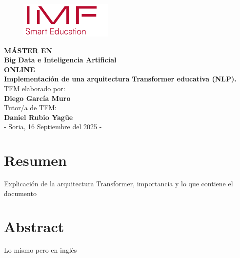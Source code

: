 \documentclass[11pt]{book}
\newcommand{\clearemptydoublepage}{\newpage{\pagestyle{empty}\cleardoublepage}}
\theoremstyle{plain}
\theoremstyle{definition}
\begin{document}
\frontmatter
\pagestyle{primeraparte}




\begin{titlepage}
    \centering

    \begin{figure}
    \centering
    \includegraphics[width=0.25\linewidth]{img/logo_imf.png}
    \end{figure}

    \vspace*{1cm}
    {\Large \textbf{MÁSTER EN} \\[0.3cm]
    \textbf{Big Data e Inteligencia Artificial} \\[1cm]
    \textbf{ONLINE}}\\[3cm]
    
    {\LARGE \textcolor{miRojo}{\textbf{Implementación de una arquitectura Transformer educativa (NLP).}}} \\[2cm]
    
    {\large TFM elaborado por: \\[0.3cm]
    \textbf{Diego García Muro}} \\[1cm]
    
    {\large Tutor/a de TFM: \\[0.3cm]
    \textbf{Daniel Rubio Yagüe}} \\[4cm]
    
    {\large - Soria, 16 Septiembre del 2025 - }
    
    \vfill
\end{titlepage}

\clearemptydoublepage



\chapter{Resumen}
 Explicación de la arquitectura Transformer, importancia y lo que contiene el documento

\clearemptydoublepage

\chapter{Abstract}
 Lo mismo pero en inglés
\clearemptydoublepage
\end{document}
